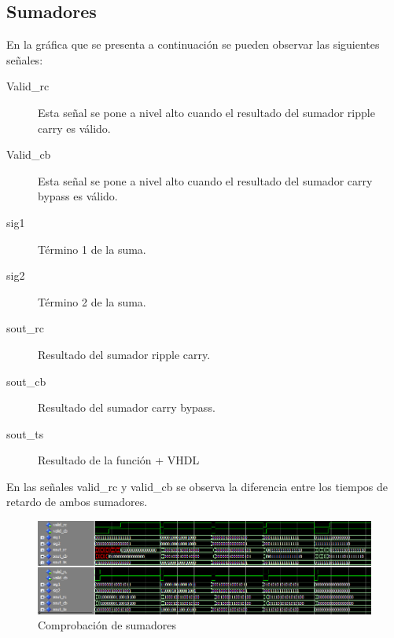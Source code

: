 \documentclass[a4paper,12pt]{article}
\begin{document}
\subsection{Sumadores}
En la gráfica que se presenta a continuación se pueden observar las siguientes señales:
\begin{description}
\item[Valid\_rc] Esta señal se pone a nivel alto cuando el resultado del sumador ripple carry es válido.
\item[Valid\_cb] Esta señal se pone a nivel alto cuando el resultado del sumador carry bypass es válido.
\item[sig1] Término 1 de la suma.
\item[sig2] Término 2 de la suma.
\item[sout\_rc] Resultado del sumador ripple carry.
\item[sout\_cb] Resultado del sumador carry bypass.
\item[sout\_ts] Resultado de la función + VHDL
\end{description}
En las señales valid\_rc y valid\_cb se observa la diferencia entre los tiempos de retardo de ambos sumadores.
\begin{figure}[hbt]
\begin{center}
\includegraphics[width=\textwidth]{img/adder_test.png} 
\caption{Comprobación de sumadores} \label{fig:addertest}
\end{center}
\end{figure}
\end{document}
